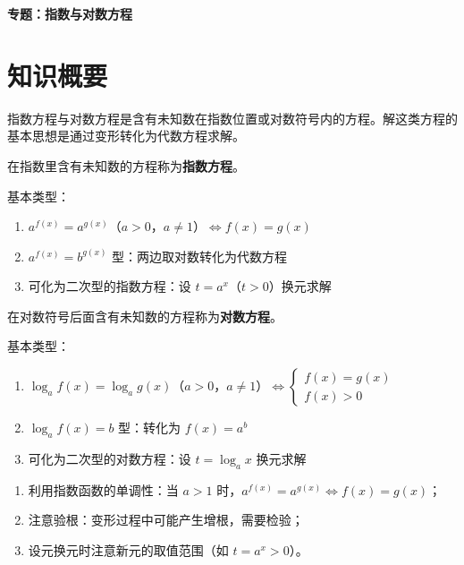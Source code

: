 \documentclass[11pt]{ctexrep}
\begin{document}
\begin{center}
    {\LARGE\bfseries 专题：指数与对数方程}
\end{center}

\section*{知识概要}

指数方程与对数方程是含有未知数在指数位置或对数符号内的方程。解这类方程的基本思想是通过变形转化为代数方程求解。

\begin{definition}[指数方程]
    在指数里含有未知数的方程称为\textbf{指数方程}。
    
    基本类型：
    \begin{enumerate}
        \item $a^{f(x)} = a^{g(x)}$（$a > 0$，$a \neq 1$）$\Leftrightarrow f(x) = g(x)$
        \item $a^{f(x)} = b^{g(x)}$ 型：两边取对数转化为代数方程
        \item 可化为二次型的指数方程：设 $t = a^x$（$t > 0$）换元求解
    \end{enumerate}
\end{definition}

\begin{definition}[对数方程]
    在对数符号后面含有未知数的方程称为\textbf{对数方程}。
    
    基本类型：
    \begin{enumerate}
        \item $\log_a f(x) = \log_a g(x)$（$a > 0$，$a \neq 1$）$\Leftrightarrow \begin{cases} f(x) = g(x) \\ f(x) > 0 \end{cases}$
        \item $\log_a f(x) = b$ 型：转化为 $f(x) = a^b$
        \item 可化为二次型的对数方程：设 $t = \log_a x$ 换元求解
    \end{enumerate}
\end{definition}

\begin{property}[解指数方程的注意事项]
    \begin{enumerate}
        \item 利用指数函数的单调性：当 $a > 1$ 时，$a^{f(x)} = a^{g(x)} \Leftrightarrow f(x) = g(x)$；
        \item 注意验根：变形过程中可能产生增根，需要检验；
        \item 设元换元时注意新元的取值范围（如 $t = a^x > 0$）。
    \end{enumerate}
\end{property}
\end{document}
